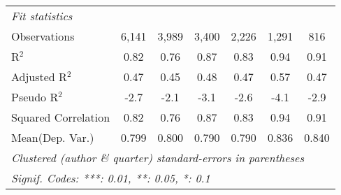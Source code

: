 \begin{tabular}{lcccccc}
   \emph{Fit statistics}\\
   Observations                                               & 6,141       & 3,989       & 3,400   & 2,226   & 1,291         & 816\\  
   R$^2$                                                      & 0.82        & 0.76        & 0.87    & 0.83    & 0.94          & 0.91\\  
   Adjusted R$^2$                                             & 0.47        & 0.45        & 0.48    & 0.47    & 0.57          & 0.47\\  
   Pseudo R$^2$                                               & -2.7        & -2.1        & -3.1    & -2.6    & -4.1          & -2.9\\  
   Squared Correlation                                        & 0.82        & 0.76        & 0.87    & 0.83    & 0.94          & 0.91\\  
Mean(Dep. Var.) & 0.799 & 0.800 & 0.790 & 0.790 & 0.836 & 0.840 \\
   \midrule \midrule
   \multicolumn{7}{l}{\emph{Clustered (author \& quarter) standard-errors in parentheses}}\\
   \multicolumn{7}{l}{\emph{Signif. Codes: ***: 0.01, **: 0.05, *: 0.1}}\\
\end{tabular}
\par\endgroup
